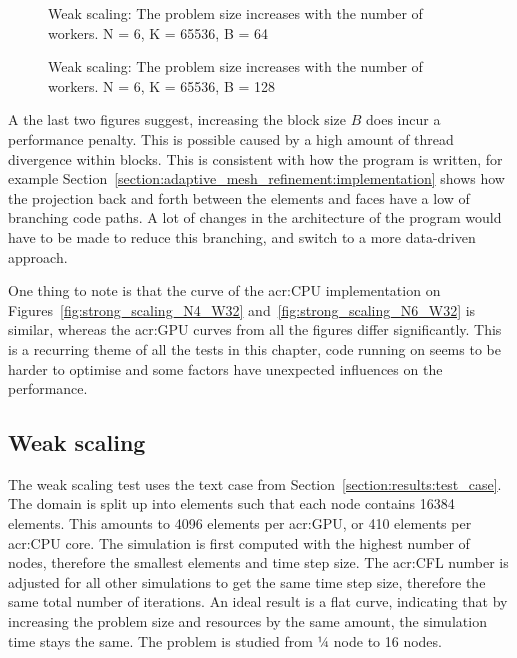 \begin{figure}[H]
	\centering
	
	\caption{Weak scaling: The problem size increases with the number of workers. N = 6, K = 65536, B = 64}
	\label{fig:strong_scaling_N6_W64}
\end{figure}

\begin{figure}[H]
	\centering
	
	\caption{Weak scaling: The problem size increases with the number of workers. N = 6, K = 65536, B = 128}
	\label{fig:strong_scaling_N6_W128}
\end{figure}

A the last two figures suggest, increasing the block size $B$ does incur a performance penalty. This
is possible caused by a high amount of thread divergence within blocks. This is consistent with how
the program is written, for example Section~\ref{section:adaptive_mesh_refinement:implementation}
shows how the projection back and forth between the elements and faces have a low of branching code
paths. A lot of changes in the architecture of the program would have to be made to reduce this
branching, and switch to a more data-driven approach.

One thing to note is that the curve of the \acrshort{acr:CPU} implementation on
Figures~\ref{fig:strong_scaling_N4_W32} and~\ref{fig:strong_scaling_N6_W32} is similar, whereas the
\acrshort{acr:GPU} curves from all the figures differ significantly. This is a recurring theme of
all the tests in this chapter, code running on  seems to be harder to optimise
and some factors have unexpected influences on the performance.

\subsection{Weak scaling} \label{subsection:results:scaling_tests:weak}

The weak scaling test uses the text case from Section~\ref{section:results:test_case}. The domain is
split up into elements such that each node contains 16384 elements. This amounts to 4096 elements
per \acrshort{acr:GPU}, or 410 elements per \acrshort{acr:CPU} core. The simulation is first
computed with the highest number of nodes, therefore the smallest elements and time step size. The
\acrshort{acr:CFL} number is adjusted for all other simulations to get the same time step size,
therefore the same total number of iterations. An ideal result is a flat curve, indicating that by
increasing the problem size and resources by the same amount, the simulation time stays the same.
The problem is studied from ¼ node to 16 nodes.

